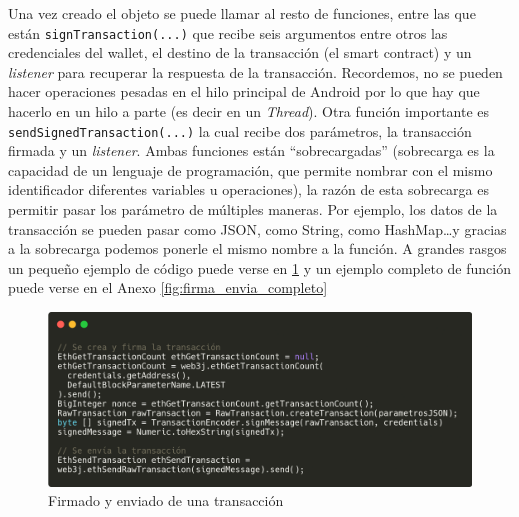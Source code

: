 Una vez creado el objeto se puede llamar al resto de funciones, entre las que están \verb|signTransaction(...)| que recibe seis argumentos entre otros las credenciales del wallet, el destino de la transacción (el smart contract) y un \emph{listener} para recuperar la respuesta de la transacción. Recordemos, no se pueden hacer operaciones pesadas en el hilo principal de Android por lo que hay que hacerlo en un hilo a parte (es decir en un \emph{Thread}). Otra función importante es \verb|sendSignedTransaction(...)| la cual recibe dos parámetros, la transacción firmada y un \emph{listener}. Ambas funciones están ``sobrecargadas'' (sobrecarga es la capacidad de un lenguaje de programación, que permite nombrar con el mismo identificador diferentes variables u operaciones), la razón de esta sobrecarga es permitir pasar los parámetro de múltiples maneras. Por ejemplo, los datos de la transacción se pueden pasar como JSON, como String, como HashMap\dots y gracias a la sobrecarga podemos ponerle el mismo nombre a la función. A grandes rasgos un pequeño ejemplo de código puede verse en \ref{fig:firmEnv} y un ejemplo completo de función puede verse en el Anexo \ref{fig:firma_envia_completo}

% 

\begin{figure}[h!]
  \centering
  \includegraphics[width=0.8\linewidth]{figs/Desarrollo/SDK/firm_env_trans}
  \caption[Firmado y enviado de una transacción]{Firmado y enviado de una transacción}
  \label{fig:firmEnv}
\end{figure}




